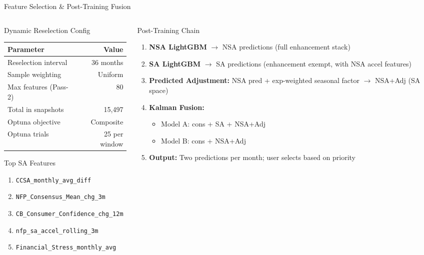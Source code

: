 \documentclass[aspectratio=169,10pt]{beamer}
\begin{document}
\begin{frame}{Feature Selection \& Post-Training Fusion}
\begin{columns}[T]
\begin{column}{0.48\textwidth}
\begin{block}{Dynamic Reselection Config}
\footnotesize
\begin{tabular}{@{}lr@{}}
\toprule
\textbf{Parameter} & \textbf{Value} \\
\midrule
Reselection interval & 36 months \\
Sample weighting & Uniform \\
Max features (Pass-2) & 80 \\
Total in snapshots & 15{,}497 \\
Optuna objective & Composite \\
Optuna trials & 25 per window \\
\bottomrule
\end{tabular}
\end{block}

\begin{exampleblock}{Top SA Features}
\scriptsize
\begin{enumerate}
  \item \texttt{CCSA\_monthly\_avg\_diff}
  \item \texttt{NFP\_Consensus\_Mean\_chg\_3m}
  \item \texttt{CB\_Consumer\_Confidence\_chg\_12m}
  \item \texttt{nfp\_sa\_accel\_rolling\_3m}
  \item \texttt{Financial\_Stress\_monthly\_avg}
\end{enumerate}
\end{exampleblock}
\end{column}
\begin{column}{0.48\textwidth}
\begin{block}{Post-Training Chain}
\footnotesize
\begin{enumerate}\scriptsize
  \item \textbf{NSA LightGBM} $\to$ NSA predictions (full enhancement stack)
  \item \textbf{SA LightGBM} $\to$ SA predictions (enhancement exempt, with NSA accel features)
  \item \textbf{Predicted Adjustment:} NSA pred + exp-weighted seasonal factor $\to$ NSA+Adj (SA space)
  \item \textbf{Kalman Fusion:}
    \begin{itemize}\scriptsize
      \item Model A: cons + SA + NSA+Adj
      \item Model B: cons + NSA+Adj
    \end{itemize}
  \item \textbf{Output:} Two predictions per month; user selects based on priority
\end{enumerate}
\end{block}
\end{column}
\end{columns}
\end{frame}
\end{document}
